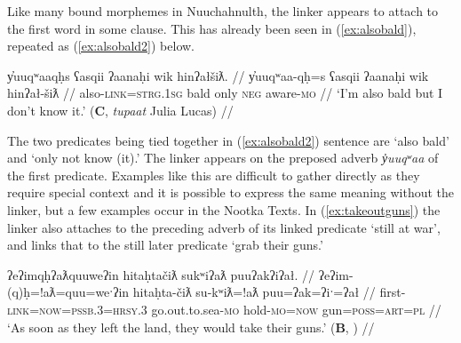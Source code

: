 Like many bound morphemes in Nuuchahnulth, the linker appears to attach to the first word in some clause. This has already been seen in (\ref{ex:alsobald}), repeated as (\ref{ex:alsobald2}) below.

\ex \label{ex:alsobald2}
\begingl
\glpreamble y̓uuqʷaaqḥs ʕasqii ʔaanaḥi wik hinʔałšiƛ. //
\gla y̓uuqʷaa-qḥ=s ʕasqii ʔaanaḥi wik hinʔał-šiƛ //
\glb also-\textsc{link}=\textsc{strg.1sg} bald only \textsc{neg} aware-\textsc{mo} //
\glft `I'm also bald but I don't know it.' (\textbf{C}, \textit{tupaat} Julia Lucas) //
\endgl
\xe

The two predicates being tied together in (\ref{ex:alsobald2}) sentence are `also bald' and `only not know (it).' The linker appears on the preposed adverb \textit{y̓uuqʷaa} of the first predicate.	 Examples like this are difficult to gather directly as they require special context and it is possible to express the same meaning without the linker, but a few examples occur in the Nootka Texts. In (\ref{ex:takeoutguns}) the linker also attaches to the preceding adverb of its linked predicate `still at war', and links that to the still later predicate `grab their guns.'

\ex \label{ex:takeoutguns}
\begingl
\glpreamble ʔeʔimqḥʔaƛquuweʔin hitaḥtačiƛ sukʷiʔaƛ puuʔakʔiʔał. //
\gla ʔeʔim-(q)ḥ=!aƛ=quu=weˑʔin hitaḥta-čiƛ su-kʷiƛ=!aƛ puu=ʔak=ʔiˑ=ʔał //
\glb first-\textsc{link}=\textsc{now}=\textsc{pssb.3}=\textsc{hrsy.3} go.out.to.sea-\textsc{mo} hold-\textsc{mo}=\textsc{now} gun=\textsc{poss}=\textsc{art}=\textsc{pl} //
\glft `As soon as they left the land, they would take their guns.' (\textbf{B}, \citealt[395]{sapir1955}) //
\endgl
\xe

\begin{comment}
In (\ref{stillatwar}), the linker again attaches to an adverb \textit{ʔiiqḥii} `still', and links the entire predicate `still doing war' to the earlier predicate \textit{qʷis} `do thus.'

\ex \label{stillatwar}
\begingl
\glpreamble qiiḥsn̓aakck̓in ʔaḥ qʷiyiič qʷis, [ʔiiqḥii\textbf{qḥ} hitačink maatmaasʔi] [qaḥsaap̓aƛquuweʔin č̓amuʔałʔaƛquu yuułuʔiłʔatqḥ huuʕiiʔatḥuʔałʔaƛquu]]. //
\gla qiiḥsn̓aak-ck̓in ʔaḥ qʷiyi=(y)ii=č [[qʷis] [ʔiiqḥii-\textbf{(q)ḥ} hitačink maatmaas=ʔiˑ]] qaḥ-saˑp=!aƛ=quu=weˑʔin  č̓am-uʔał=!aƛ=quu yuułuʔiłʔatḥ-(q)ḥ huuʕiiʔatḥ-uʔał=!aƛ=quu. //
\glb long.time-\textsc{dim} \textsc{d1} when=\textsc{weak.3}=\textsc{hrsy} do.thus still-\text{link} go.against tribe.\textsc{pl}=\textsc{art} kill-\textsc{mo.caus}=\textsc{now}=\textsc{pssb.3}=\textsc{hrsy.3} canoe-see=\textsc{now}=\textsc{pssb.3} Ucluelet-\textsc{link} Huuayaht-see=\textsc{pssb.3}=\textsc{hrsy.3} //
\glft `For a little longer after this happened, while the tribes were still at war, the Ucluelets would kill Huu-ay-ahts when they saw their canoes.' (\textbf{B}, \citealt[392]{sapir1955}) //
\endgl
\xe
\end{comment}


